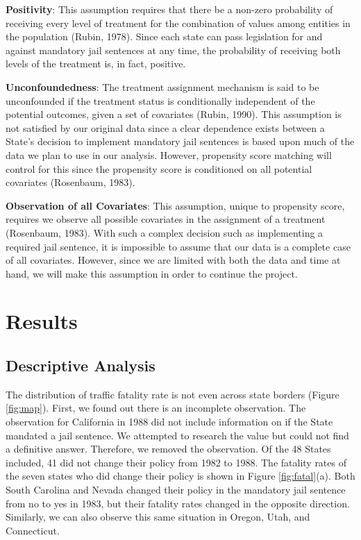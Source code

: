 \documentclass[]{article}
\begin{document}
\textbf{Positivity}: This assumption requires that there be a non-zero probability of receiving every level of treatment for the combination of values among entities in the population (Rubin, 1978). Since each state can pass legislation for and against mandatory jail sentences at any time, the probability of receiving both levels of the treatment is, in fact, positive.

\textbf{Unconfoundedness}: The treatment assignment mechanism is said to be unconfounded if the treatment status is conditionally independent of the potential outcomes, given a set of covariates (Rubin, 1990). This assumption is not satisfied by our original data since a clear dependence exists between a State's decision to implement mandatory jail sentences is based upon much of the data we plan to use in our analysis. However, propensity score matching will control for this since the propensity score is conditioned on all potential covariates (Rosenbaum, 1983).

\textbf{Observation of all Covariates}: This assumption, unique to propensity score, requires we observe all possible covariates in the assignment of a treatment (Rosenbaum, 1983). With such a complex decision such as implementing a required jail sentence, it is impossible to assume that our data is a complete case of all covariates. However, since we are limited with both the data and time at hand, we will make this assumption in order to continue the project.

\hypertarget{results}{%
\section{Results}\label{results}}

\hypertarget{descriptive-analysis}{%
\subsection{Descriptive Analysis}\label{descriptive-analysis}}

The distribution of traffic fatality rate is not even across state borders (Figure \ref{fig:map}). First, we found out there is an incomplete observation. The observation for California in 1988 did not include information on if the State mandated a jail sentence. We attempted to research the value but could not find a definitive answer. Therefore, we removed the observation. Of the 48 States included, 41 did not change their policy from 1982 to 1988. The fatality rates of the seven states who did change their policy is shown in Figure \ref{fig:fatal}(a). Both South Carolina and Nevada changed their policy in the mandatory jail sentence from no to yes in 1983, but their fatality rates changed in the opposite direction. Similarly, we can also observe this same situation in Oregon, Utah, and Connecticut.
\end{document}
